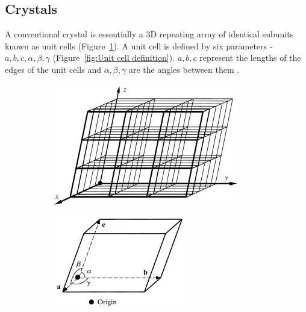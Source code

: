     \subsection{Crystals}
    \label{sub:Crystals}
        A conventional crystal is essentially a 3D repeating array of identical subunits known as unit cells (Figure~\ref{fig:Unit cells as building blocks}).
        A unit cell is defined by six parameters - $a, b, c, \alpha, \beta, \gamma$ (Figure~\ref{fig:Unit cell definition}).
        $a, b, c$ represent the lengths of the edges of the unit cells and $\alpha, \beta, \gamma$ are the angles between them \cite{drenth2012}.
        \begin{figure}[H]
            \centering
            \begin{subfigure}[b]{0.45\textwidth}
                    \centering
                    \includegraphics[width=\textwidth]{figures/introduction/unitcellsbuildingblocks.png}
                    \caption{}
                    \label{fig:Unit cells as building blocks}
            \end{subfigure}
            \qquad
            \begin{subfigure}[b]{0.4\textwidth}
                    \centering
                    \includegraphics[width=\textwidth]{figures/introduction/unitcelldefinition.png}

\end{subfigure}
\end{figure}
